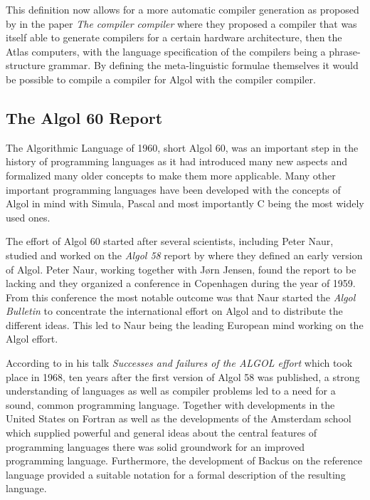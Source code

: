 \documentclass{article}
\begin{document}
This definition now allows for a more automatic compiler generation as proposed by \citet{brooker1963compiler} in the paper \textit{The compiler compiler} where they proposed a compiler that was itself able to generate compilers for a certain hardware architecture, then the Atlas computers, with the language specification of the compilers being a phrase-structure grammar. By defining the meta-linguistic formulae themselves it would be possible to compile a compiler for Algol with the compiler compiler.

\subsection{The Algol 60 Report}

The Algorithmic Language of 1960, short Algol 60, was an important step in the history of programming languages as it had introduced many new aspects and formalized many older concepts to make them more applicable. Many other important programming languages have been developed with the concepts of Algol in mind with Simula, Pascal and most importantly C being the most widely used ones.

The effort of Algol 60 started after several scientists, including Peter Naur, studied and worked on the \textit{Algol 58} report by \citet{baueralgol} where they defined an early version of Algol. Peter Naur, working together with Jørn Jensen, found the report to be lacking and they organized a conference in Copenhagen during the year of 1959. From this conference the most notable outcome was that Naur started the \textit{Algol Bulletin} to concentrate the international effort on Algol and to distribute the different ideas. This led to Naur being the leading European mind working on the Algol effort.

According to \citet{naur1968successes} in his talk \textit{Successes and failures of the ALGOL effort} which took place in 1968, ten years after the first version of Algol 58 was published, a strong understanding of languages as well as compiler problems led to a need for a sound, common programming language. Together with developments in the United States on Fortran as well as the developments of the Amsterdam school which supplied powerful and general ideas about the central features of programming languages there was solid groundwork for an improved programming language. Furthermore, the development of Backus on the reference language provided a suitable notation for a formal description of the resulting language.
\end{document}
